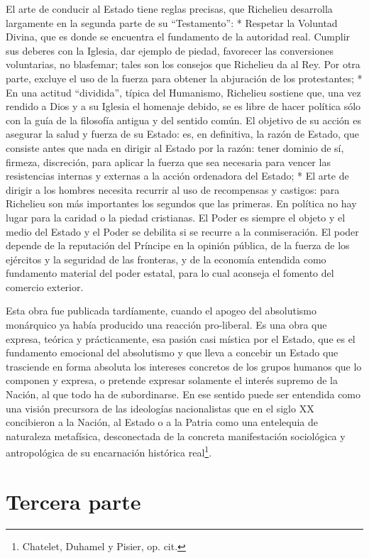 \documentclass[
]{book}
\begin{document}
El arte de conducir al Estado tiene reglas precisas, que Richelieu desarrolla largamente en la segunda parte de su ``Testamento'': * Respetar la Voluntad Divina, que es donde se encuentra el fundamento de la autoridad real. Cumplir sus deberes con la Iglesia, dar ejemplo de piedad, favorecer las conversiones voluntarias, no blasfemar; tales son los consejos que Richelieu da al Rey. Por otra parte, excluye el uso de la fuerza para obtener la abjuración de los protestantes; * En una actitud ``dividida'', típica del Humanismo, Richelieu sostiene que, una vez rendido a Dios y a su Iglesia el homenaje debido, se es libre de hacer política sólo con la guía de la filosofía antigua y del sentido común. El objetivo de su acción es asegurar la salud y fuerza de su Estado: es, en definitiva, la razón de Estado, que consiste antes que nada en dirigir al Estado por la razón: tener dominio de sí, firmeza, discreción, para aplicar la fuerza que sea necesaria para vencer las resistencias internas y externas a la acción ordenadora del Estado; * El arte de dirigir a los hombres necesita recurrir al uso de recompensas y castigos: para Richelieu son más importantes los segundos que las primeras. En política no hay lugar para la caridad o la piedad cristianas. El Poder es siempre el objeto y el medio del Estado y el Poder se debilita si se recurre a la conmiseración. El poder depende de la reputación del Príncipe en la opinión pública, de la fuerza de los ejércitos y la seguridad de las fronteras, y de la economía entendida como fundamento material del poder estatal, para lo cual aconseja el fomento del comercio exterior.

Esta obra fue publicada tardíamente, cuando el apogeo del absolutismo monárquico ya había producido una reacción pro-liberal. Es una obra que expresa, teórica y prácticamente, esa pasión casi mística por el Estado, que es el fundamento emocional del absolutismo y que lleva a concebir un Estado que trasciende en forma absoluta los intereses concretos de los grupos humanos que lo componen y expresa, o pretende expresar solamente el interés supremo de la Nación, al que todo ha de subordinarse. En ese sentido puede ser entendida como una visión precursora de las ideologías nacionalistas que en el siglo XX concibieron a la Nación, al Estado o a la Patria como una entelequia de naturaleza metafísica, desconectada de la concreta manifestación sociológica y antropológica de su encarnación histórica real\footnote{Chatelet, Duhamel y Pisier, op. cit.}.

\hypertarget{tercera-parte-1}{%
\section*{Tercera parte}\label{tercera-parte-1}}
\end{document}
